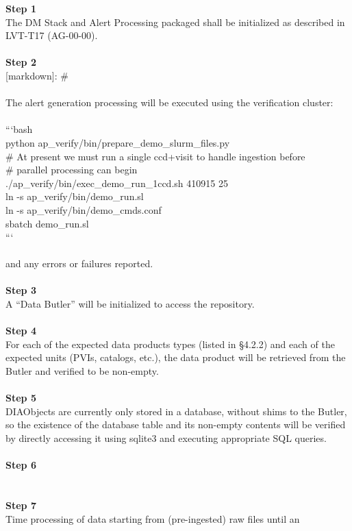\textbf{Step 1}\\
The DM Stack and Alert Processing packaged shall be initialized as
described in LVT-T17 (AG-00-00).\\
~\\
\textbf{Step 2}\\
{[}markdown{]}: \#\\
~\\
The alert generation processing will be executed using the verification
cluster:\\
~\\
```bash\\
python ap\_verify/bin/prepare\_demo\_slurm\_files.py\\
\# At present we must run a single ccd+visit to handle ingestion
before\\
\# parallel processing can begin\\
./ap\_verify/bin/exec\_demo\_run\_1ccd.sh 410915 25\\
ln -s ap\_verify/bin/demo\_run.sl\\
ln -s ap\_verify/bin/demo\_cmds.conf\\
sbatch demo\_run.sl\\
```\\
~\\
and any errors or failures reported.\\
~\\
\textbf{Step 3}\\
A ``Data Butler'' will be initialized to access the repository.\\
~\\
\textbf{Step 4}\\
For each of the expected data products types (listed in §4.2.2) and each
of the expected units (PVIs, catalogs, etc.), the data product will be
retrieved from the Butler and verified to be non-empty.\\
~\\
\textbf{Step 5}\\
DIAObjects are currently only stored in a database, without shims to the
Butler, so the existence of the database table and its non-empty
contents will be verified by directly accessing it using sqlite3 and
executing appropriate SQL queries.\\
~\\
\textbf{Step 6}\\
~\\
~\\
\textbf{Step 7}\\
Time processing of data starting from (pre-ingested) raw files until an
